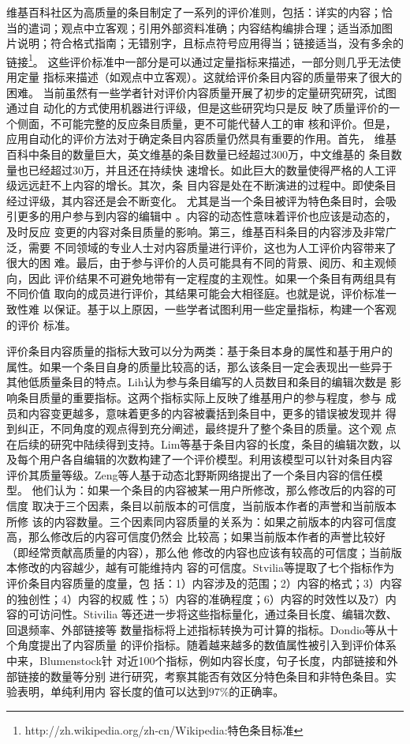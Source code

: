 维基百科社区为高质量的条目制定了一系列的评价准则，包括：详实的内容；恰
当的遣词；观点中立客观；引用外部资料准确；内容结构编排合理；适当添加图
片说明；符合格式指南；无错别字，且标点符号应用得当；链接适当，没有多余的链接\footnote{http://zh.wikipedia.org/zh-cn/Wikipedia:特色条目标准}。
这些评价标准中一部分是可以通过定量指标来描述，一部分则几乎无法使用定量
指标来描述（如观点中立客观）。这就给评价条目内容的质量带来了很大的困难。
当前虽然有一些学者针对评价内容质量开展了初步的定量研究研究，试图通过自
动化的方式使用机器进行评级，但是这些研究均只是反
映了质量评价的一个侧面，不可能完整的反应条目质量，更不可能代替人工的审
核和评价。但是，应用自动化的评价方法对于确定条目内容质量仍然具有重要的作用。首先，
维基百科中条目的数量巨大，英文维基的条目数量已经超过300万，中文维基的
条目数量也已经超过30万，并且还在持续快
速增长。如此巨大的数量使得严格的人工评级远远赶不上内容的增长。其次，条
目内容是处在不断演进的过程中。即使条目经过评级，其内容还是会不断变化。
尤其是当一个条目被评为特色条目时，会吸引更多的用户参与到内容的编辑中
\cite{thomas.woehner}。内容的动态性意味着评价也应该是动态的，及时反应
变更的内容对条目质量的影响。第三，维基百科条目的内容涉及非常广泛，需要
不同领域的专业人士对内容质量进行评价，这也为人工评价内容带来了很大的困
难。最后，由于参与评价的人员可能具有不同的背景、阅历、和主观倾向，因此
评价结果不可避免地带有一定程度的主观性。如果一个条目有两组具有不同价值
取向的成员进行评价，其结果可能会大相径庭。也就是说，评价标准一致性难
以保证。基于以上原因，一些学者试图利用一些定量指标，构建一个客观的评价
标准。

评价条目内容质量的指标大致可以分为两类：基于条目本身的属性和基于用户的
属性。如果一个条目自身的质量比较高的话，那么该条目一定会表现出一些异于
其他低质量条目的特点。Lih认为参与条目编写的人员数目和条目的编辑次数是
影响条目质量的重要指标。这两个指标实际上反映了维基用户的参与程度，参与
成员和内容变更越多，意味着更多的内容被囊括到条目中，更多的错误被发现并
得到纠正，不同角度的观点得到充分阐述，最终提升了整个条目的质量。这个观
点在后续的研究中陆续得到支持。Lim等基于条目内容的长度，条目的编辑次数，以
及每个用户各自编辑的次数构建了一个评价模型。利用该模型可以针对条目内容
评价其质量等级。Zeng等人基于动态北野斯网络提出了一个条目内容的信任模型。
他们认为：如果一个条目的内容被某一用户所修改，那么修改后的内容的可信度
取决于三个因素，条目以前版本的可信度，当前版本作者的声誉和当前版本所修
该的内容数量。三个因素同内容质量的关系为：如果之前版本的内容可信度高，那么修改后的内容可信度仍然会
比较高；如果当前版本作者的声誉比较好（即经常贡献高质量的内容），那么他
修改的内容也应该有较高的可信度；当前版本修改的内容越少，越有可能维持内
容的可信度。Stvilia等提取了七个指标作为评价条目内容质量的度量，包
括：1）内容涉及的范围；2）内容的格式；3）内容的独创性；4）内容的权威
性；5）内容的准确程度；6）内容的时效性以及7）内容的可访问性。Stivilia
等还进一步将这些指标量化，通过条目长度、编辑次数、回退频率、外部链接等
数量指标将上述指标转换为可计算的指标。Dondio等从十个角度提出了内容质量
的评价指标。随着越来越多的数值属性被引入到评价体系中来，Blumenstock针
对近100个指标，例如内容长度，句子长度，内部链接和外部链接的数量等分别
进行研究，考察其能否有效区分特色条目和非特色条目。实验表明，单纯利用内
容长度的值可以达到$97\%$的正确率。


